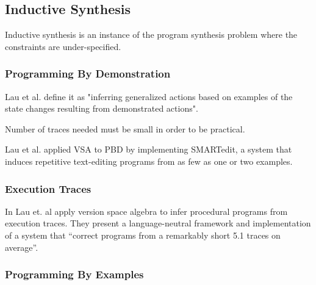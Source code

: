 \subsection{Inductive Synthesis}
\label{sec:inductive}

Inductive synthesis is an instance of the program synthesis problem where the
constraints are under-specified.

\subsubsection{Programming By Demonstration}


Lau et al. define it as "inferring generalized actions based on examples of the
state changes resulting from demonstrated actions".

Number of traces needed must be small in order to be practical.

Lau et al. applied VSA to PBD by implementing SMARTedit, a system that induces
repetitive text-editing programs from as few as one or two examples.

\subsubsection{Execution Traces}


In \cite{Lau:traces:2003} Lau et. al apply version space algebra to infer
procedural programs from execution traces.
They present a language-neutral framework and implementation of a system that
``correct programs from a remarkably short 5.1 traces on average''.

\subsubsection{Programming By Examples}



